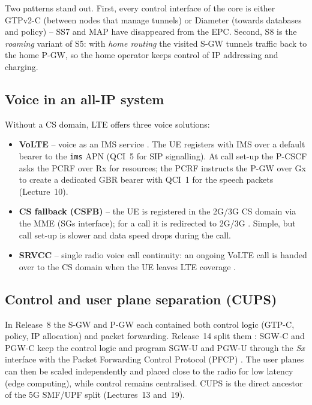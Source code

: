 \documentclass[11pt,a4paper]{article}
\begin{document}
Two patterns stand out. First, every control interface of the core is either GTPv2-C (between
nodes that manage tunnels) or Diameter (towards databases and policy) -- SS7 and MAP have
disappeared from the EPC. Second, S8 is the \emph{roaming} variant of S5: with \emph{home
routing} the visited S-GW tunnels traffic back to the home P-GW, so the home operator keeps
control of IP addressing and charging.

\subsection{Voice in an all-IP system}
Without a CS domain, LTE offers three voice solutions:
\begin{itemize}
  \item \textbf{VoLTE} -- voice as an IMS service \cite{ts23228}. The UE registers with IMS over a
        default bearer to the \texttt{ims} APN (QCI~5 for SIP signalling). At call set-up the
        P-CSCF asks the PCRF over Rx for resources; the PCRF instructs the P-GW over Gx to create a
        dedicated GBR bearer with QCI~1 for the speech packets (Lecture~10).
  \item \textbf{CS fallback (CSFB)} -- the UE is registered in the 2G/3G CS domain via the MME
        (SGs interface); for a call it is redirected to 2G/3G \cite{ts23272}. Simple, but call
        set-up is slower and data speed drops during the call.
  \item \textbf{SRVCC} -- single radio voice call continuity: an ongoing VoLTE call is handed
        over to the CS domain when the UE leaves LTE coverage \cite{ts23216}.
\end{itemize}

\subsection{Control and user plane separation (CUPS)}
In Release~8 the S-GW and P-GW each contained both control logic (GTP-C, policy, IP allocation)
and packet forwarding. Release~14 split them \cite{ts23214}: SGW-C and PGW-C keep the control
logic and program SGW-U and PGW-U through the \emph{Sx} interface with the Packet Forwarding
Control Protocol (PFCP) \cite{ts29244}. The user planes can then be scaled independently and
placed close to the radio for low latency (edge computing), while control remains centralised.
CUPS is the direct ancestor of the 5G SMF/UPF split (Lectures~13 and~19).

\end{document}
